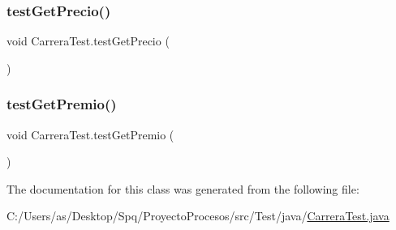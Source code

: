 \mbox{\label{class_carrera_test_abbedc0671839401d1312ddf20b60a48f}} 
\subsubsection{\texorpdfstring{testGetPrecio()}{testGetPrecio()}}
{\footnotesize\ttfamily void Carrera\+Test.\+test\+Get\+Precio (\begin{DoxyParamCaption}{ }\end{DoxyParamCaption})}

\mbox{\label{class_carrera_test_a98adb151ad831f74469b79f1c9f3c43f}} 
\subsubsection{\texorpdfstring{testGetPremio()}{testGetPremio()}}
{\footnotesize\ttfamily void Carrera\+Test.\+test\+Get\+Premio (\begin{DoxyParamCaption}{ }\end{DoxyParamCaption})}



The documentation for this class was generated from the following file\+:\begin{DoxyCompactItemize}
\item 
C\+:/\+Users/as/\+Desktop/\+Spq/\+Proyecto\+Procesos/src/\+Test/java/\mbox{\hyperlink{_carrera_test_8java}{Carrera\+Test.\+java}}\end{DoxyCompactItemize}
